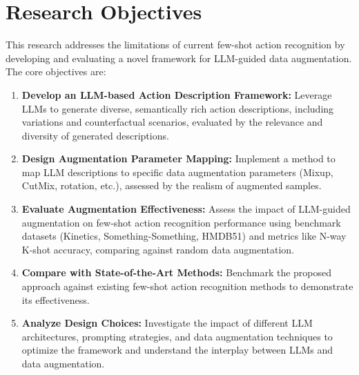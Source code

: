 \section*{Research Objectives}

This research addresses the limitations of current few-shot action recognition by developing and evaluating a novel framework for LLM-guided data augmentation. The core objectives are:

\begin{enumerate}
    \parsep=20pt
    \item \textbf{Develop an LLM-based Action Description Framework:} Leverage LLMs to generate diverse, semantically rich action descriptions, including variations and counterfactual scenarios, evaluated by the relevance and diversity of generated descriptions.
    \item \textbf{Design Augmentation Parameter Mapping:} Implement a method to map LLM descriptions to specific data augmentation parameters (Mixup, CutMix, rotation, etc.), assessed by the realism of augmented samples.
    \item \textbf{Evaluate Augmentation Effectiveness:} Assess the impact of LLM-guided augmentation on few-shot action recognition performance using benchmark datasets (Kinetics, Something-Something, HMDB51) and metrics like N-way K-shot accuracy, comparing against random data augmentation.
    \item \textbf{Compare with State-of-the-Art Methods:} Benchmark the proposed approach against existing few-shot action recognition methods to demonstrate its effectiveness.
    \item \textbf{Analyze Design Choices:} Investigate the impact of different LLM architectures, prompting strategies, and data augmentation techniques to optimize the framework and understand the interplay between LLMs and data augmentation.
\end{enumerate}
